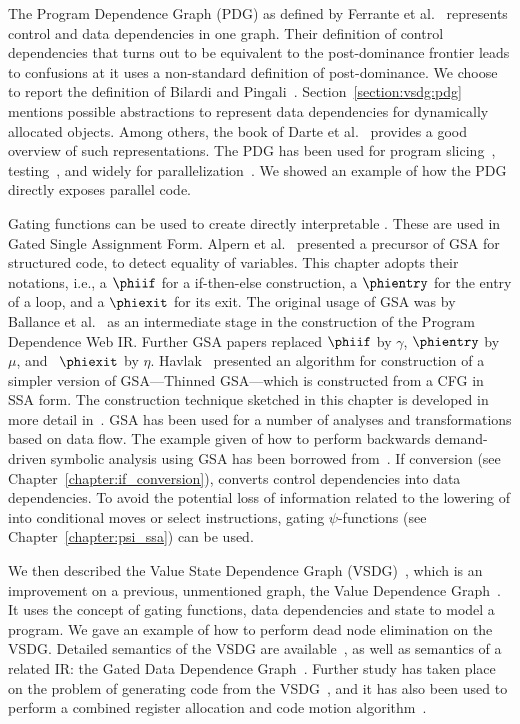 The Program Dependence Graph (PDG) as defined by Ferrante et al.~\cite{ferrante87the} represents control and data dependencies in one graph. 
Their definition of control dependencies that turns out to be equivalent to the post-dominance frontier leads to confusions at it uses a non-standard definition of post-dominance. 
We choose to report the definition of Bilardi and Pingali~\cite{Bilardi1996}. 
Section~\ref{section:vsdg:pdg} mentions possible abstractions to represent data dependencies for dynamically allocated objects. 
Among others, the book of Darte et al.~\cite{DarteRV-book} provides a good overview of such representations. 
The PDG has been used for program slicing~\cite{ottenstein84program}, testing~\cite{bates93incremental}, and widely for parallelization~\cite{ferrante85on,ferrante88generating,simons90a,baxter89program}. 
We showed an example of how the PDG directly exposes parallel code.

Gating functions can be used to create directly interpretable \phifuns. 
These are used in Gated Single Assignment Form. 
Alpern et al.~\cite{AlpernWZ88} presented a precursor of GSA for structured code, to detect equality of variables. 
This chapter adopts their notations, i.e., a $\phiif$ for a if-then-else construction, a $\phientry$ for the entry of a loop, and a $\phiexit$ for its exit. 
The original usage of GSA was by Ballance et al.~\cite{93578} as an intermediate stage in the construction of the Program Dependence Web IR. 
Further GSA papers replaced $\phiif$ by $\gamma$, $\phientry$ by $\mu$, and ~$\phiexit$ by $\eta$. 
Havlak~\cite{Havlak93constructionof} presented an algorithm for construction of a simpler version of GSA---Thinned GSA---which is constructed from a CFG in SSA form. 
The construction technique sketched in this chapter is developed in more detail in~\cite{207115}. 
GSA has been used for a number of analyses and transformations based on data flow. 
The example given of how to perform backwards demand-driven symbolic analysis using GSA has been borrowed from~\cite{tu95gated}. 
If conversion (see Chapter~\ref{chapter:if_conversion}), converts control dependencies into data dependencies. 
To avoid the potential loss of information related to the lowering of \phifuns into conditional moves or select instructions, gating $\psi$-functions (see Chapter~\ref{chapter:psi_ssa}) can be used.

We then described the Value State Dependence Graph (VSDG)~\cite{UCAM-CL-TR-607}, which is an improvement on a previous, unmentioned graph, the Value Dependence Graph~\cite{177907}. 
It uses the concept of gating functions, data dependencies and state to model a program. 
We gave an example of how to perform dead node elimination on the VSDG. 
Detailed semantics of the VSDG are available~\cite{UCAM-CL-TR-607}, as well as semantics of a related IR: 
the Gated Data Dependence Graph~\cite{upton}. 
Further study has taken place on the problem of generating code from the VSDG~\cite{DBLP:conf/pdpta/Upton03,UCAM-CL-TR-705,stanier11thesis}, and it has also been used to perform a combined register allocation and code motion algorithm~\cite{Johnson_combinedcode}.
